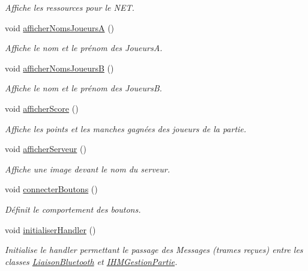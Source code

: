 \begin{DoxyCompactItemize}
\begin{DoxyCompactList}\small\item\em Affiche les ressources pour le N\+ET. \end{DoxyCompactList}\item 
void \hyperlink{classcom_1_1example_1_1area_1_1_i_h_m_gestion_partie_adf3bc699cb45da1f1dea4cb5e16e74f3}{afficher\+Noms\+JoueursA} ()
\begin{DoxyCompactList}\small\item\em Affiche le nom et le prénom des JoueursA. \end{DoxyCompactList}\item 
void \hyperlink{classcom_1_1example_1_1area_1_1_i_h_m_gestion_partie_a55e51d83d01ea0c3c6400f6419edfd06}{afficher\+Noms\+JoueursB} ()
\begin{DoxyCompactList}\small\item\em Affiche le nom et le prénom des JoueursB. \end{DoxyCompactList}\item 
void \hyperlink{classcom_1_1example_1_1area_1_1_i_h_m_gestion_partie_a42cce9ee62fd37d687d4a194328aac70}{afficher\+Score} ()
\begin{DoxyCompactList}\small\item\em Affiche les points et les manches gagnées des joueurs de la partie. \end{DoxyCompactList}\item 
void \hyperlink{classcom_1_1example_1_1area_1_1_i_h_m_gestion_partie_adf8fc8de224da80f542675cbb4c2e364}{afficher\+Serveur} ()
\begin{DoxyCompactList}\small\item\em Affiche une image devant le nom du serveur. \end{DoxyCompactList}\item 
void \hyperlink{classcom_1_1example_1_1area_1_1_i_h_m_gestion_partie_a6be1ce3804251a75cef8d58514645e2c}{connecter\+Boutons} ()
\begin{DoxyCompactList}\small\item\em Définit le comportement des boutons. \end{DoxyCompactList}\item 
void \hyperlink{classcom_1_1example_1_1area_1_1_i_h_m_gestion_partie_a26db1ff779d6ce415ab481dd79295115}{initialiser\+Handler} ()
\begin{DoxyCompactList}\small\item\em Initialise le handler permettant le passage des Messages (trames reçues) entre les classes \hyperlink{classcom_1_1example_1_1area_1_1_liaison_bluetooth}{Liaison\+Bluetooth} et \hyperlink{classcom_1_1example_1_1area_1_1_i_h_m_gestion_partie}{I\+H\+M\+Gestion\+Partie}. \end{DoxyCompactList}\item 

\end{DoxyCompactItemize}
